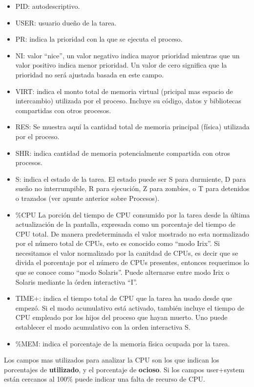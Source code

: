 \documentclass[12pt]{article}
\begin{document}
\begin{itemize}
\item PID: autodescriptivo. 
\item USER: usuario dueño de la tarea.
\item PR: indica la prioridad con la que se ejecuta el proceso. 
\item NI: valor ``nice'', un valor negativo indica mayor prioridad mientras
que un valor positivo indica menor prioridad. Un valor de cero significa
que la prioridad no será ajustada basada en este campo. 
\item VIRT: indica el monto total de memoria virtual (pricipal mas espacio
de intercambio) utilizada por el proceso. Incluye su código, datos y 
bibliotecas compartidas con otros procesos.  
\item RES: Se muestra aquí la cantidad total de memoria principal (física)
 utilizada  por el proceso.  
\item SHR: indica cantidad  de  memoria potencialmente compartida con otros
procesos.
\item S: indica el estado  de  la tarea. El estado puede ser S para 
durmiente, D para sueño no interrumpible, R para ejecución, Z para zombies,
o  T para detenidos o trazados (ver apunte anterior sobre Procesos). 
\item \%CPU La  porción  del  tiempo  de  CPU  consumido por la tarea desde
la última actualización de la pantalla, expresada como un  porcentaje del 
tiempo de CPU total. De manera predeterminada el valor mostrado no esta
normalizado por el número total de CPUs, esto es conocido como 
``modo Irix''. Si necesitamos el valor normalizado por la canitdad de CPUs,
es decir que se divida el porcentaje por el número de CPUs presentes, 
entonces requerimos lo que se conoce como ``modo Solaris''. Puede alternarse
entre modo Irix o Solaris mediante la órden interactiva ``I''. 
\item TIME+: indica el tiempo total de CPU que la tarea ha usado desde que 
empezó. Si el  modo  acumulativo está activado, también incluye el tiempo
de  CPU empleado por los hijos del proceso que hayan muerto. Uno puede
establecer  el  modo  acumulativo  con la orden interactiva  S.  
\item \%MEM: indica el porcentaje de la memoria física ocupada por la tarea.
\end{itemize}


Los campos mas utilizados para analizar la CPU son los que indican los porcentajes de \textbf{utilizado},
y el porcentaje de \textbf{ocioso}. Si los campos user+system están cercanos al 100\% puede indicar una falta de recurso de CPU.
\end{document}
